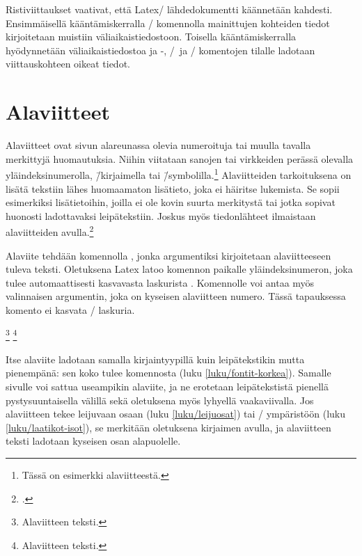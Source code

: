 Ristiviittaukset vaativat, että Latex\-/ lähdedokumentti käännetään
kahdesti. Ensimmäisellä kääntämiskerralla \-/ komennolla
mainittujen kohteiden tiedot kirjoitetaan muistiin väliaikaistiedostoon.
Toisella kääntämiskerralla hyödynnetään väliaikaistiedostoa ja
-, \-/\ ja \-/ komentojen
tilalle ladotaan viittauskohteen oikeat tiedot.

\section{Alaviitteet}
\label{luku/alaviitteet}

Alaviitteet ovat sivun alareunassa olevia numeroituja tai muulla tavalla
merkittyjä huomautuksia. Niihin viitataan sanojen tai virkkeiden perässä
olevalla yläindeksinumerolla, \=/kirjaimella tai
\=/symbolilla.\footnote{Tässä on esimerkki alaviitteestä.} Alaviitteiden
tarkoituksena on lisätä tekstiin lähes huomaamaton lisätieto, joka ei
häiritse lukemista. Se sopii esimerkiksi lisätietoihin, joilla ei ole
kovin suurta merkitystä tai jotka sopivat huonosti ladottavaksi
leipätekstiin. Joskus myös tiedonlähteet ilmaistaan alaviitteiden
avulla.\footcites[162]{kt_oik}[127--128]{typokk}

Alaviite tehdään komennolla , jonka argumentiksi
kirjoitetaan alaviitteeseen tuleva teksti. Oletuksena Latex latoo
komennon paikalle yläindeksinumeron, joka tulee automaattisesti
kasvavasta laskurista . Komennolle voi antaa myös
valinnaisen argumentin, joka on kyseisen alaviitteen numero. Tässä
tapauksessa komento ei kasvata \-/ laskuria.

\begin{koodilohkosis}
\footnote{Alaviitteen teksti.}
\footnote[numero]{Alaviitteen teksti.}
\end{koodilohkosis}

\noindent
Itse alaviite ladotaan samalla kirjaintyypillä kuin leipätekstikin mutta
pienempänä: sen koko tulee komennosta  (luku
\ref{luku/fontit-korkea}). Samalle sivulle voi sattua useampikin
alaviite, ja ne erotetaan leipätekstistä pienellä pystysuuntaisella
välillä sekä oletuksena myös lyhyellä vaakaviivalla. Jos alaviitteen
tekee leijuvaan osaan (luku \ref{luku/leijuosat}) tai
\-/ ympäristöön (luku \ref{luku/laatikot-isot}), se
merkitään oletuksena kirjaimen avulla, ja alaviitteen teksti ladotaan
kyseisen osan alapuolelle.

